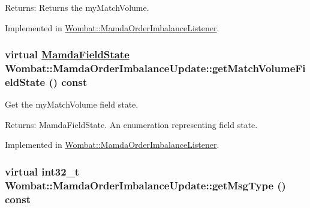 \begin{Desc}
\item[Returns:]Returns the my\-Match\-Volume. \end{Desc}


Implemented in \hyperlink{classWombat_1_1MamdaOrderImbalanceListener_db5df0bb4c22c84ef0572046aaf98220}{Wombat::Mamda\-Order\-Imbalance\-Listener}.\hypertarget{classWombat_1_1MamdaOrderImbalanceUpdate_656bd7d9029dafa1b306f2d1314daabe}{
\subsubsection[getMatchVolumeFieldState]{\setlength{\rightskip}{0pt plus 5cm}virtual \hyperlink{namespaceWombat_93aac974f2ab713554fd12a1fa3b7d2a}{Mamda\-Field\-State} Wombat::Mamda\-Order\-Imbalance\-Update::get\-Match\-Volume\-Field\-State () const}}
\label{classWombat_1_1MamdaOrderImbalanceUpdate_656bd7d9029dafa1b306f2d1314daabe}


Get the my\-Match\-Volume field state. 

\begin{Desc}
\item[Returns:]Mamda\-Field\-State. An enumeration representing field state. \end{Desc}


Implemented in \hyperlink{classWombat_1_1MamdaOrderImbalanceListener_bbba7d810e3b01e9b2041d3a0e0e517d}{Wombat::Mamda\-Order\-Imbalance\-Listener}.\hypertarget{classWombat_1_1MamdaOrderImbalanceUpdate_e98942bd6896e4596932dd61bdeb074d}{
\subsubsection[getMsgType]{\setlength{\rightskip}{0pt plus 5cm}virtual int32\_\-t Wombat::Mamda\-Order\-Imbalance\-Update::get\-Msg\-Type () const}}
\label{classWombat_1_1MamdaOrderImbalanceUpdate_e98942bd6896e4596932dd61bdeb074d}



